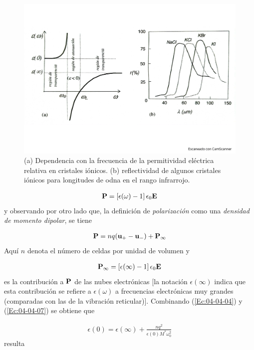\begin{figure}[h!] \centering
	\includegraphics[scale=0.5]{Cuerpo/Ch_04/Fotos libro 8.pdf}
	\caption{(a) Dependencia con la frecuencia de la permitividad eléctrica relativa en cristales iónicos. (b) reflectividad de algunos cristales iónicos para longitudes de odna en el rango infrarrojo.}
	\label{Fig:04-08}
\end{figure}    


\begin{eqnarray}
	\mathbf{P} = \left[ \epsilon (\omega) -1  \right] \epsilon_0  \mathbf{E}
\end{eqnarray}
y observando por otro lado que, la definición de \textit{polarización} como una \textit{densidad de momento dipolar}, se tiene  

\begin{eqnarray}
	\mathbf{P} = n q (\mathbf{u}_+ - \mathbf{u}_-) + \mathbf{P}_\infty
\end{eqnarray}
Aquí $n$ denota el número de celdas por unidad de volumen y 

\begin{eqnarray}
	\mathbf{P}_\infty = \left[ \epsilon (\infty) -1  \right] \epsilon_0 \mathbf{E}\label{Ec:04-04-07}
\end{eqnarray}
es la contribución a $\mathbf{P}$ de las nubes electrónicas [la notación $\epsilon (\infty)$ indica que esta contribución se refiere a $\epsilon (\omega)$ a frecuencias electrónicas muy grandes (comparadas con las de la vibración reticular)]. Combinando (\ref{Ec:04-04-04}) y (\ref{Ec:04-04-07}) se obtiene que

\begin{eqnarray}
	\epsilon(0) = \epsilon(\infty)  + \frac{nq^2}{\epsilon(0) M^*\omega_0^2}
\end{eqnarray}
resulta 

